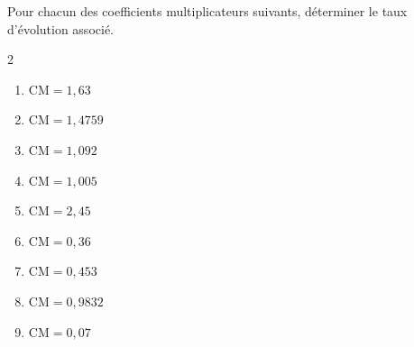 \begin{exo}{}
	Pour chacun des coefficients multiplicateurs suivants, déterminer le taux d'évolution associé.

	\vspace*{-2mm}\begin{multicols}{2}
	\begin{enumerate}
		\item $\text{CM} = 1,63$
		\item $\text{CM} = 1,4759$
		\item $\text{CM} = 1,092$
		\item $\text{CM} = 1,005$
		\item $\text{CM} = 2,45$
		\item $\text{CM} = 0,36$
		\item $\text{CM} = 0,453$
		\item $\text{CM} = 0,9832$
		\item $\text{CM} = 0,07$
	\end{enumerate}\end{multicols}\vspace*{-2mm}
\end{exo}
